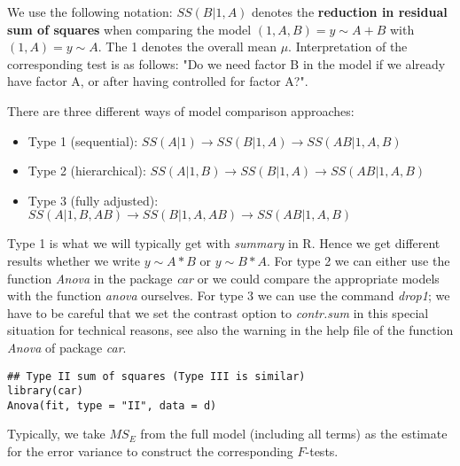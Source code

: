 We use the following notation: $SS( B | 1, A)$ denotes the \textbf{reduction in residual sum of squares} when comparing the model $(1, A, B) = y \sim A + B$ with $(1, A) = y \sim A$. The 1 denotes the overall mean $\mu$. Interpretation of the corresponding test is as follows: "Do we need factor B in the model if we already have factor A, or after having controlled for factor A?". \medskip

There are three different ways of model comparison approaches:
\begin{itemize}
	\item Type 1 (sequential): $SS(A | 1) \to SS(B | 1, A) \to SS(AB | 1, A, B)$
	\item Type 2 (hierarchical): $SS(A | 1, B) \to SS(B | 1, A) \to SS(AB | 1, A, B)$
	\item Type 3 (fully adjusted): $SS(A | 1, B, AB) \to SS(B | 1, A, AB) \to SS(AB | 1, A, B)$
\end{itemize}

Type 1 is what we will typically get with \textit{summary} in R. Hence we get different results whether we write $y \sim A * B$ or $y \sim B * A$. For type 2 we can either use the function \textit{Anova} in the package \textit{car} or we could compare the appropriate models with the function \textit{anova} ourselves. For type 3 we can use the command \textit{drop1}; we have to be careful that we set the contrast option to \textit{contr.sum} in this special situation for technical reasons, see also the warning in the help file of the function \textit{Anova} of package \textit{car}.

\begin{lstlisting}
## Type II sum of squares (Type III is similar)
library(car)
Anova(fit, type = "II", data = d)	
\end{lstlisting}

Typically, we take $MS_E$ from the full model (including all terms) as the estimate for the error variance to construct the corresponding $F$-tests.
